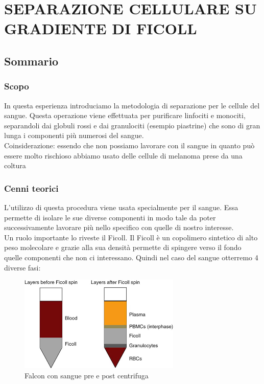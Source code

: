 \section{\LARGE{SEPARAZIONE CELLULARE SU GRADIENTE DI FICOLL}}

\vspace{0.6cm}

\subsection{Sommario}

\subsubsection{Scopo}


In questa esperienza introduciamo la metodologia di separazione per le cellule del sangue. Questa operazione viene effettuata per purificare linfociti e monociti, separandoli dai globuli rossi e dai granulociti (esempio piastrine) che sono di gran lunga i componenti più numerosi del sangue.\\
Coinsiderazione: essendo che non possiamo lavorare con il sangue in quanto può essere molto rischioso abbiamo usato delle cellule di melanoma prese da una coltura


\subsubsection{Cenni teorici}
L'utilizzo di questa procedura viene usata specialmente per il sangue.
Essa permette di isolare le sue diverse componenti in modo tale da poter successivamente
lavorare più nello specifico con quelle di nostro interesse.\\
Un ruolo importante lo riveste il Ficoll.
Il Ficoll è un copolimero sintetico di alto peso molecolare e grazie alla sua densità
permette di spingere verso il fondo quelle componenti che non ci interessano.
Quindi nel caso del sangue otterremo 4 diverse fasi:
\begin{figure}[H]
    \centering
    \includegraphics{./immagini/Ficoll_sangue.png}
    \caption{Falcon con sangue pre e post centrifuga}
\end{figure}

